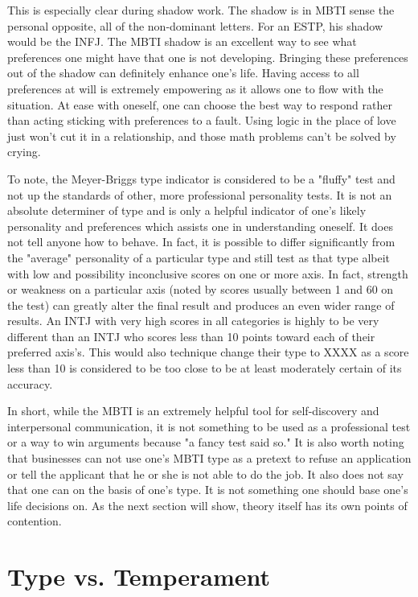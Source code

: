 This is especially clear during shadow work. The shadow is in MBTI sense the personal opposite, all of the non-dominant letters. For an ESTP, his shadow would be the INFJ. The MBTI shadow is an excellent way to see what preferences one might have that one is not developing. Bringing these preferences out of the shadow can definitely enhance one's life. Having access to all preferences at will is extremely empowering as it allows one to flow with the situation. At ease with oneself, one can choose the best way to respond rather than acting sticking with preferences to a fault. Using logic in the place of love just won't cut it in a relationship, and those math problems can't be solved by crying.

To note, the Meyer-Briggs type indicator is considered to be a "fluffy" test and not up the standards of other, more professional personality tests. It is not an absolute determiner of type and is only a helpful indicator of one's likely personality and preferences which assists one in understanding oneself. It does not tell anyone how to behave. In fact, it is possible to differ significantly from the "average" personality of a particular type and still test as that type albeit with low and possibility inconclusive scores on one or more axis. In fact, strength or weakness on a particular axis (noted by scores usually between 1 and 60 on the test) can greatly alter the final result and produces an even wider range of results. An INTJ with very high scores in all categories is highly to be very different than an INTJ who scores less than 10 points toward each of their preferred axis's. This would also technique change their type to XXXX as a score less than 10 is considered to be too close to be at least moderately certain of its accuracy.

In short, while the MBTI is an extremely helpful tool for self-discovery and interpersonal communication, it is not something to be used as a professional test or a way to win arguments because "a fancy test said so." It is also worth noting that businesses can not use one's MBTI type as a pretext to refuse an application or tell the applicant that he or she is not able to do the job. It also does not say that one can on the basis of one's type. It is not something one should base one's life decisions on. As the next section will show, theory itself has its own points of contention.

\section{Type vs. Temperament}

